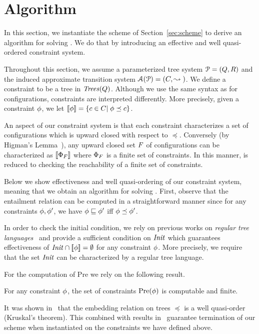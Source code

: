 \section{Algorithm}
\label{sec:alg}
%
In this section, we instantiate the scheme of Section~\ref{sec:scheme} to derive 
an algorithm for solving \acovproblem.
%
We do that by introducing an effective and well quasi-ordered constraint system.
%

Throughout this section, we assume a parameterized tree system ${\EuScript P}=\left(Q,R\right)$
and the induced approximate transition system ${\EuScript A}({{\EuScript P}})=\left(C,\stackrel{}\leadsto{}\right)$.
%
We define a constraint to be a tree in ${\it Trees}({Q})$.
%
Although we use the same syntax as for configurations, constraints are interpreted 
differently.
%
More precisely, given a constraint $\phi$, we let $[\![{\phi}]\!]=\left\{c
\in C|\;\phi\preceq c\right\}$. 
%

An aspect of our constraint system is that each constraint characterizes a set of 
configurations which is upward closed with respect to $\preceq$.
%
Conversely (by Higman's Lemma~\cite{Higman:divisibility}), any upward closed set 
$F$ of configurations can be characterized as $[\![{\Phi_F}]\!]$ 
where $\Phi_F$ is a finite set of constraints.
%
In this manner, \acovproblem{} is reduced to checking the reachability of a finite set of 
constraints.
%

Below we show effectiveness and well quasi-ordering of our constraint system, meaning that 
we obtain an algorithm for solving \acovproblem{}.
%
First, observe that the entailment relation can be computed in a straightforward manner since 
for any constraints $\phi,\phi'$, we have  $\phi\sqsubseteq\phi'$ iff $\phi\preceq\phi'$.
%

In order to check the initial condition, we rely on previous works on \emph{regular tree languages}~\cite{CoDa:book} 
and provide a sufficient condition on ${\it Init}$ which guarantees effectiveness of ${\it Init}\cap[\![{
\phi}]\!]=\emptyset$ for any constraint $\phi$.
%
More precisely, we require that the set ${\it Init}$ can be characterized by a regular tree
language.
%

For the computation of Pre we rely on the following result.
%
\begin{lemma}
\label{lem:pre:comp}
For any constraint $\phi$, the set of constraints $\text{Pre}({\phi})$ is computable and finite.
\end{lemma}
%

It was shown in~\cite{kruskal} that the embedding relation on trees $\preceq$ is a well quasi-order 
(Kruskal's theorem).
%
This combined with results in~\cite{Parosh:Bengt:Karlis:Tsay:general} guarantee termination of 
our scheme when instantiated on the constraints we have defined above.
%


